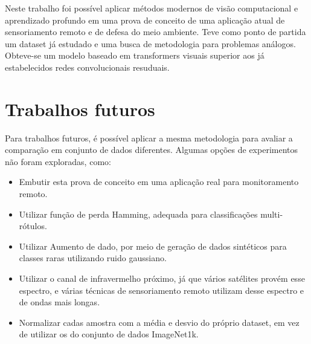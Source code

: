 Neste trabalho foi possível aplicar métodos modernos de visão computacional e aprendizado profundo em uma prova de conceito de uma aplicação atual de sensoriamento remoto e de defesa do meio ambiente.  Teve como ponto de partida um dataset já estudado e uma busca de metodologia para problemas análogos. Obteve-se um modelo baseado em transformers visuais superior aos já estabelecidos redes convolucionais resuduais.

\section{Trabalhos futuros}

Para trabalhos futuros, é possível aplicar a mesma metodologia para avaliar a comparação em conjunto de dados diferentes. Algumas opções de experimentos não foram exploradas, como:
\begin{itemize}
    \item Embutir esta prova de conceito em uma aplicação real para monitoramento remoto.
    \item Utilizar função de perda Hamming, adequada para classificações multi-rótulos.
    \item Utilizar Aumento de dado, por meio de geração de dados sintéticos para classes raras utilizando ruido gaussiano.
    \item Utilizar o canal de infravermelho próximo, já que vários satélites provém esse espectro, e várias técnicas de sensoriamento remoto utilizam desse espectro e de ondas mais longas.
    \item Normalizar cadas amostra com a média e desvio do próprio dataset, em vez de utilizar os do conjunto de dados ImageNet1k.
\end{itemize}
